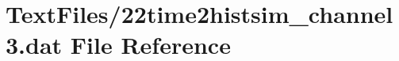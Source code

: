 \hypertarget{22time2histsim__channel3_8dat}{}\section{Text\+Files/22time2histsim\+\_\+channel3.dat File Reference}
\label{22time2histsim__channel3_8dat}
